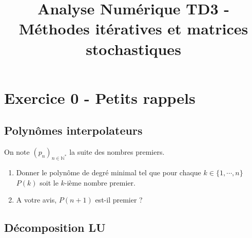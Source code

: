 

\title{Analyse Numérique TD3 - Méthodes itératives et matrices stochastiques}

\author{}
\date{}


\sffamily
\maketitle

\section*{Exercice 0 - Petits rappels}

\subsection*{Polynômes interpolateurs}
On note $(p_n)_{n\in\mathbb{N^*}}$ la suite des nombres premiers. 
\begin{enumerate}
    \item Donner le polynôme de degré minimal tel que pour chaque $k\in\{1, \cdots, n\}$ $P(k)$ soit le $k$-ième nombre premier. 
    \item A votre avis, $P(n+1)$ est-il premier ?
\end{enumerate}

\subsection*{Décomposition LU}


